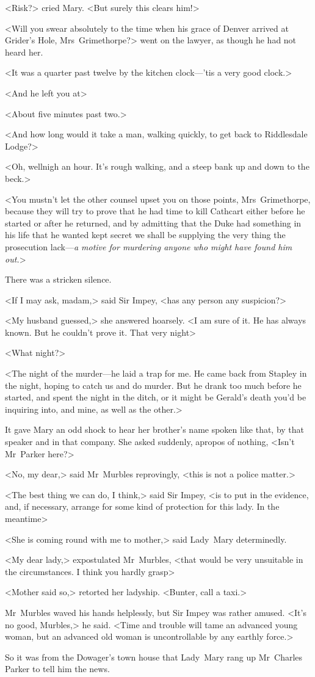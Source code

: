 <Risk?> cried Mary. <But surely this clears him!>

<Will you swear absolutely to the time when his grace of Denver arrived at Grider's Hole, Mrs~Grimethorpe?> went on the lawyer, as though he had not heard her.

<It was a quarter past twelve by the kitchen clock—'tis a very good clock.>

<And he left you at\longdash>

<About five minutes past two.>

<And how long would it take a man, walking quickly, to get back to Riddlesdale Lodge?>

<Oh, wellnigh an hour. It's rough walking, and a steep bank up and down to the beck.>

<You mustn't let the other counsel upset you on those points, Mrs~Grimethorpe, because they will try to prove that he had time to kill Cathcart either before he started or after he returned, and by admitting that the Duke had something in his life that he wanted kept secret we shall be supplying the very thing the prosecution lack—\emph{a motive for murdering anyone who might have found him out.}>

There was a stricken silence.

<If I may ask, madam,> said Sir Impey, <has any person any suspicion?>

<My husband guessed,> she answered hoarsely. <I am sure of it. He has always known. But he couldn't prove it. That very night\longdash>

<What night?>

<The night of the murder—he laid a trap for me. He came back from Stapley in the night, hoping to catch us and do murder. But he drank too much before he started, and spent the night in the ditch, or it might be Gerald's death you'd be inquiring into, and mine, as well as the other.>

It gave Mary an odd shock to hear her brother's name spoken like that, by that speaker and in that company. She asked suddenly, apropos of nothing, <Isn't Mr~Parker here?>

<No, my dear,> said Mr~Murbles reprovingly, <this is not a police matter.>

<The best thing we can do, I think,> said Sir Impey, <is to put in the evidence, and, if necessary, arrange for some kind of protection for this lady. In the meantime\longdash>

<She is coming round with me to mother,> said Lady~Mary determinedly.

<My dear lady,> expostulated Mr~Murbles, <that would be very unsuitable in the circumstances. I think you hardly grasp\longdash>

<Mother said so,> retorted her ladyship. <Bunter, call a taxi.>

Mr~Murbles waved his hands helplessly, but Sir Impey was rather amused. <It's no good, Murbles,> he said. <Time and trouble will tame an advanced young woman, but an advanced old woman is uncontrollable by any earthly force.>

So it was from the Dowager's town house that Lady~Mary rang up Mr~Charles Parker to tell him the news.